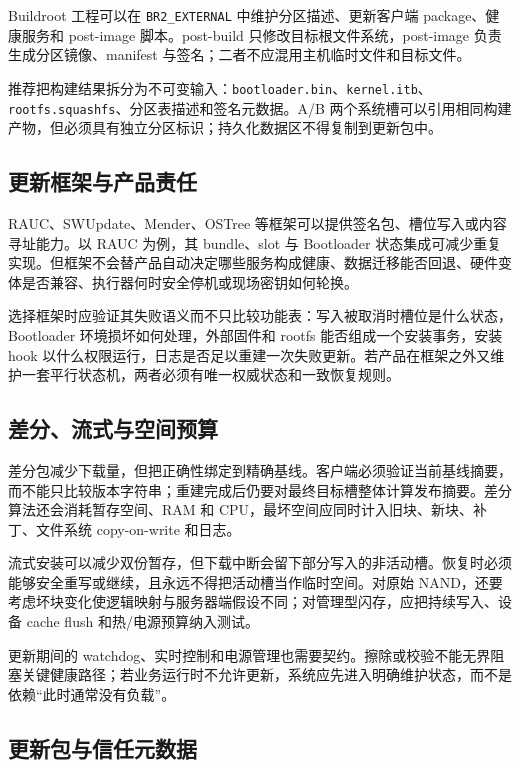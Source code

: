 Buildroot 工程可以在 \texttt{BR2\_EXTERNAL} 中维护分区描述、更新客户端 package、健康服务和 post-image 脚本。post-build 只修改目标根文件系统，post-image 负责生成分区镜像、manifest 与签名；二者不应混用主机临时文件和目标文件。

推荐把构建结果拆分为不可变输入：\texttt{bootloader.bin}、\texttt{kernel.itb}、\texttt{rootfs.squashfs}、分区表描述和签名元数据。A/B 两个系统槽可以引用相同构建产物，但必须具有独立分区标识；持久化数据区不得复制到更新包中。

\subsection{更新框架与产品责任}

RAUC、SWUpdate、Mender、OSTree 等框架可以提供签名包、槽位写入或内容寻址能力。以 RAUC 为例，其 bundle、slot 与 Bootloader 状态集成可减少重复实现\cite{rauc-doc}。但框架不会替产品自动决定哪些服务构成健康、数据迁移能否回退、硬件变体是否兼容、执行器何时安全停机或现场密钥如何轮换。

选择框架时应验证其失败语义而不只比较功能表：写入被取消时槽位是什么状态，Bootloader 环境损坏如何处理，外部固件和 rootfs 能否组成一个安装事务，安装 hook 以什么权限运行，日志是否足以重建一次失败更新。若产品在框架之外又维护一套平行状态机，两者必须有唯一权威状态和一致恢复规则。

\subsection{差分、流式与空间预算}

差分包减少下载量，但把正确性绑定到精确基线。客户端必须验证当前基线摘要，而不能只比较版本字符串；重建完成后仍要对最终目标槽整体计算发布摘要。差分算法还会消耗暂存空间、RAM 和 CPU，最坏空间应同时计入旧块、新块、补丁、文件系统 copy-on-write 和日志。

流式安装可以减少双份暂存，但下载中断会留下部分写入的非活动槽。恢复时必须能够安全重写或继续，且永远不得把活动槽当作临时空间。对原始 NAND，还要考虑坏块变化使逻辑映射与服务器端假设不同；对管理型闪存，应把持续写入、设备 cache flush 和热/电源预算纳入测试。

更新期间的 watchdog、实时控制和电源管理也需要契约。擦除或校验不能无界阻塞关键健康路径；若业务运行时不允许更新，系统应先进入明确维护状态，而不是依赖“此时通常没有负载”。

\subsection{更新包与信任元数据}

